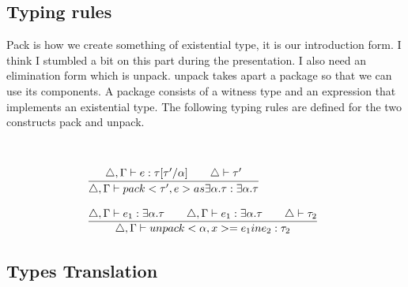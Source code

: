 \documentclass[10pt]{article}
\begin{document}
                                                                                                                                                                                                                                                                                                                                                                                                                                                                                                                                                                                                                                                                                                                                                                                                                                                                                                                 
  \subsection{Typing rules}
  \vskip 0.2in
  Pack is how we create something of existential type, it is our introduction form. I think I stumbled a bit on this part during the presentation. 
  \vskip 0.1in
  I also need an elimination form which is unpack. unpack takes apart a package so that we can
  use its components.  A package consists of a witness type and an expression that
  implements an existential type. The following typing rules are defined for the two constructs pack and unpack. 
  
  \[
  \begin{array}{cc}
 
  \\\\
  
  \infr
  {\bigtriangleup,\envent{e}{\tau[\tau' / \alpha]} \iand
  	\bigtriangleup \vdash{\tau'}}
  {\bigtriangleup, \envent{pack < \tau', e > as \exists \alpha.\tau}{\exists \alpha.\tau}}

 
  \\\\
   \multicolumn{2}{c}{ %
  	\infr
  	 {\bigtriangleup,\envent{e_1}{\exists \alpha.\tau} \iand
  		                        \bigtriangleup,\envent{e_1}{\exists \alpha.\tau}             \iand
  	\bigtriangleup \vdash{\tau_2}}
  	 {\bigtriangleup, \envent{unpack < \alpha, x > = e_1 in e_2} \tau_2}
  }
  \end{array}
  \]
  
 \subsection{Types Translation}
  
\end{document}
